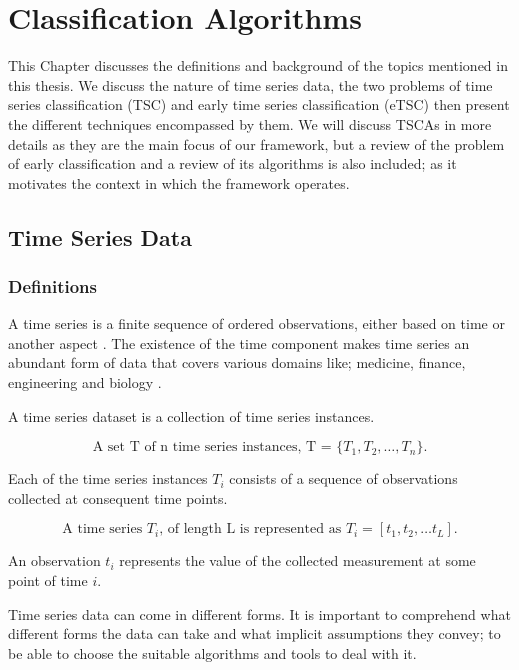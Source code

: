 \chapter{Classification Algorithms}
\label{ChapterClassificationAlgorithms}
This Chapter discusses the definitions and background of the topics mentioned in this thesis.
We discuss the nature of time series data, the two problems of time series classification (TSC) and early time series classification (eTSC) then present the different techniques encompassed by them.
We will discuss TSCAs in more details as they are the main focus of our framework, but a review of the problem of early classification and a review of its algorithms is also included;
as it motivates the context in which the framework operates.

\section{Time Series Data}
\label{TimeSeriesData}

\subsection{Definitions}
\label{TSDefinitions}
A time series is a finite sequence of ordered observations, either based on time or another aspect \cite{abanda2019review,bagnall2017great}.
The existence of the time component makes time series an abundant form of data that covers various domains like; medicine, finance, engineering and biology \cite{lines2018time}.

A time series dataset is a collection of time series instances.
\begin{definition}
    \[ \textstyle \text{A set T of n time series instances, T = } \{T_{1}, T_{2}, \ldots ,T_{n}\}. \]
\end{definition}
Each of the time series instances $T_{i}$ consists of a sequence of observations collected at consequent time points.
\begin{definition}
    \[ \textstyle \text{A time series } T_{i} \text{, of length L is represented as } T_{i} = [t_{1}, t_{2}, \ldots t_{L}]. \]
\end{definition}
An observation $t_{i}$ represents the value of the collected measurement at some point of time $i$.

Time series data can come in different forms. It is important to comprehend what different forms the data can take and what implicit assumptions they convey; to be able to choose the suitable algorithms and tools to deal with it.

